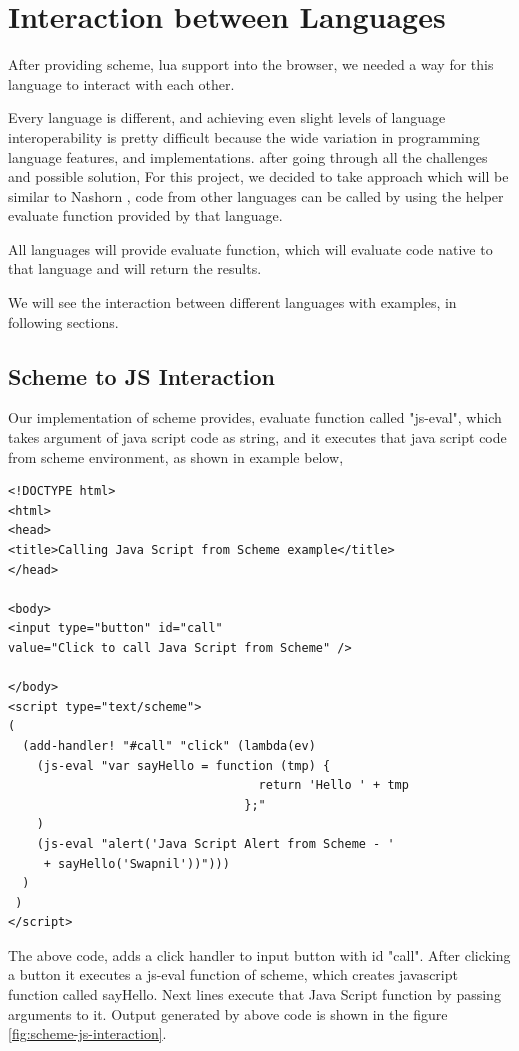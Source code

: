 \chapter{Interaction between Languages} \label{interaction}

After providing scheme, lua support into the browser, we needed a way for this language to interact with each other. 

Every language is different, and achieving even slight levels of language interoperability is pretty difficult because the wide variation in programming language features, and implementations. after going through all the challenges and possible solution, For this project, we decided to take approach which will be similar to Nashorn \cite{Juneau2017}, code from other languages can be called by using the helper evaluate function provided by that language.

All languages will provide evaluate function, which will evaluate code native to that language and will return the results.

We will see the interaction between different languages with examples, in following sections.

\section{Scheme to JS Interaction}

Our implementation of scheme provides, evaluate function called "js-eval", which takes argument of java script code as string, and it executes that java script code from scheme environment, as shown in example below,

\begin{lstlisting}[frame=single]
<!DOCTYPE html>
<html>
<head>
<title>Calling Java Script from Scheme example</title>
</head>

<body>
<input type="button" id="call" 
value="Click to call Java Script from Scheme" />

</body>
<script type="text/scheme">
(
  (add-handler! "#call" "click" (lambda(ev)
    (js-eval "var sayHello = function (tmp) {
                                   return 'Hello ' + tmp
                                 };"
    )
    (js-eval "alert('Java Script Alert from Scheme - ' 
     + sayHello('Swapnil'))")))
  )
 )
</script>
\end{lstlisting}

The above code, adds a click handler to input button with id "call". After clicking a button it executes a js-eval function of scheme, which creates javascript function called sayHello.  Next lines execute that Java Script function by passing arguments to it.  Output generated by above code is shown in the figure \ref{fig:scheme-js-interaction}.

